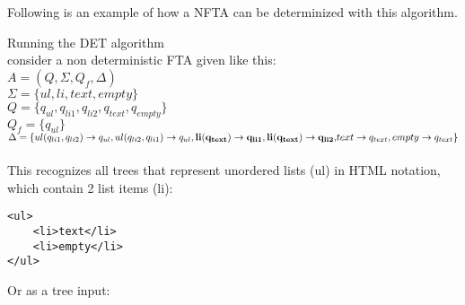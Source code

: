 \documentclass{llncs}
\begin{document}
\pagebreak

\newcommand{\automatonDefinition} {
	\(A = (Q, \Sigma, Q_f, \Delta)\)
}

\noindent
Following is an example of how a NFTA can be determinized with this algorithm.

	\begin{example}{Running the DET algorithm}
		\\
		consider a non deterministic FTA given like this:\\
		\automatonDefinition\\
		\(\Sigma = \{ul, li, text, empty\}\)\\
		\(Q = \{q_{ul}, q_{li1}, q_{li2}, q_{text}, q_{empty}\}\)\\
		\(Q_f = \{q_{ul}\}\)\\
		\(\Delta = \{
		ul(q_{li1},q_{li2}) \rightarrow q_{ul}, ul(q_{li2},q_{li1}) \rightarrow q_{ul}, \\
		\mathbf{li(q_{text}) \rightarrow q_{li1}, li(q_{text}) \rightarrow q_{li2},}\\
		text \rightarrow q_{text}, empty \rightarrow q_{text}
		\}\)
		\\\\
		This recognizes all trees that represent unordered lists (ul) in HTML notation, which contain 2 list items (li):
			\lstset{
				basicstyle=\footnotesize, frame=tb,
				xleftmargin=.4\textwidth, xrightmargin=.5\textwidth
			}
			\begin{lstlisting}[frame=none]
<ul>
    <li>text</li>
    <li>empty</li>
</ul>
			\end{lstlisting}
			Or as a tree input:
			\begin{center}
\end{center}
\end{example}
\end{document}
